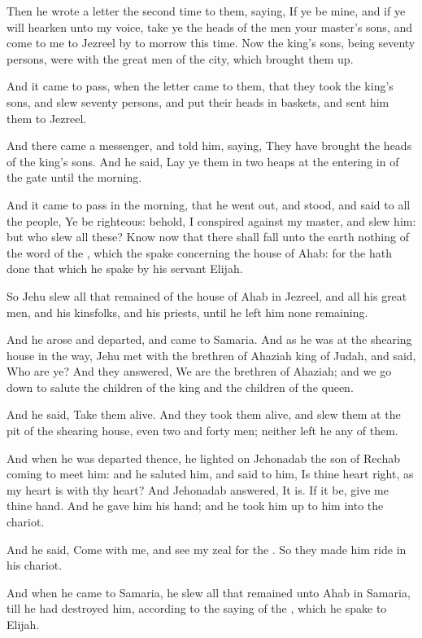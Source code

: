 \verse Then he wrote a letter the second time to them, saying, If ye be mine, and if ye will hearken unto my voice, take ye the heads of the men your master's sons, and come to me to Jezreel by to morrow this time. Now the king's sons, being seventy persons, were with the great men of the city, which brought them up.

\verse And it came to pass, when the letter came to them, that they took the king's sons, and slew seventy persons, and put their heads in baskets, and sent him them to Jezreel.

\verse And there came a messenger, and told him, saying, They have brought the heads of the king's sons. And he said, Lay ye them in two heaps at the entering in of the gate until the morning.

\verse And it came to pass in the morning, that he went out, and stood, and said to all the people, Ye be righteous: behold, I conspired against my master, and slew him: but who slew all these?  \verse Know now that there shall fall unto the earth nothing of the word of the \LORD, which the \LORD spake concerning the house of Ahab: for the \LORD hath done that which he spake by his servant Elijah.

\verse So Jehu slew all that remained of the house of Ahab in Jezreel, and all his great men, and his kinsfolks, and his priests, until he left him none remaining.

\verse And he arose and departed, and came to Samaria. And as he was at the shearing house in the way, \verse Jehu met with the brethren of Ahaziah king of Judah, and said, Who are ye? And they answered, We are the brethren of Ahaziah; and we go down to salute the children of the king and the children of the queen.

\verse And he said, Take them alive. And they took them alive, and slew them at the pit of the shearing house, even two and forty men; neither left he any of them.

\verse And when he was departed thence, he lighted on Jehonadab the son of Rechab coming to meet him: and he saluted him, and said to him, Is thine heart right, as my heart is with thy heart? And Jehonadab answered, It is. If it be, give me thine hand. And he gave him his hand; and he took him up to him into the chariot.

\verse And he said, Come with me, and see my zeal for the \LORD. So they made him ride in his chariot.

\verse And when he came to Samaria, he slew all that remained unto Ahab in Samaria, till he had destroyed him, according to the saying of the \LORD, which he spake to Elijah.

